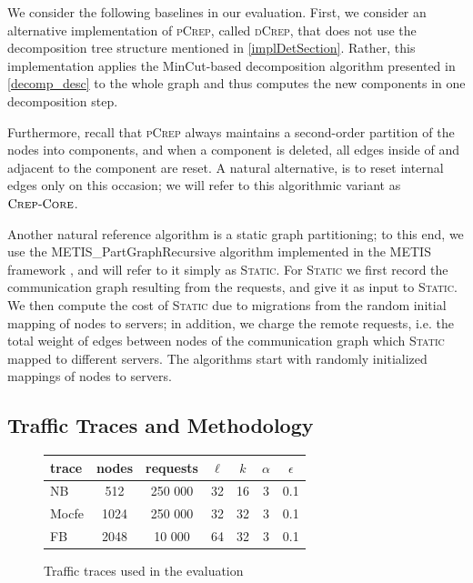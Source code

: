 \documentclass[a4paper,UKenglish,cleveref, autoref, thm-restate,authorcolumns]{lipics-v2019}
\newcommand{\adjDel}{\textsc{pCrep}}
\newcommand{\static}{\textsc{Static}}
\newcommand{\directDecomp}{\textsc{dCrep}}
\newcommand{\coreDel}{\text{C{\scriptsize REP}-C{\scriptsize ORE}}}
\newcommand{\fb}{FB}
\newcommand{\dbmocfe}{Mocfe}
\newcommand{\dbnekbone}{NB}
\begin{document}
We consider the following baselines in our evaluation.
First, we consider an alternative implementation 
of \adjDel{}, called \directDecomp{}, that does not use the decomposition tree 
	structure mentioned in \cref{implDetSection}.
	Rather, this implementation 
	applies the MinCut-based decomposition algorithm presented in \cref{decomp_desc}
	to the whole graph and thus computes the new components in one decomposition step.

Furthermore, recall that \adjDel{} always maintains a second-order partition of the nodes 
into components, and when a component is deleted, all edges inside of and adjacent to the component are reset. 
A natural alternative, is to reset internal edges only on this occasion;
we will refer to this algorithmic variant as $\coreDel$.

Another natural reference algorithm is a static graph partitioning;
to this end, we use the METIS\_PartGraphRecursive algorithm 
implemented in the METIS framework \cite{Karypis1998, Karypis1998a},
and will refer to it simply as \static{}. %
For \static{} we first record the communication graph resulting
from the requests, and give it as input to \static{}. 
We then compute the cost of \static{} due to migrations from the random initial mapping of nodes to servers; in addition, we charge 
the remote requests, i.e. the total weight of edges between nodes of the communication graph which \static{} mapped to different servers.
The algorithms start with randomly initialized mappings of nodes to servers.

\subsection{Traffic Traces and Methodology}
\label{inputDesc}

\begin{figure}
	\begin{center}
		\begin{tabular}{|l|c|c|c|c|c|c|}
			\hline
			trace & nodes & requests & $\ell$ & $k$ & $\alpha$ & $\epsilon$\\
			\hline
			\dbnekbone{} & 512 & 250 000 & 32 & 16 & 3 & 0.1 \\
			\dbmocfe{} & 1024 & 250 000 & 32 & 32 & 3 & 0.1 \\
			\fb{} & 2048 & 10 000 & 64 & 32 & 3 & 0.1 \\
			\hline
		\end{tabular}
	\end{center}
	\caption{Traffic traces used in the evaluation}
	\label{fig:trace_overview}
\end{figure}
\end{document}
